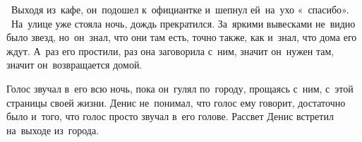 ~Выходя из~кафе, он~подошел к~официантке и~шепнул ей~на~ухо «~спасибо».
~На~улице уже стояла ночь, дождь прекратился.
За~яркими вывесками не~видно было звезд, но~он~знал, что они там есть, точно также, как и~знал, что дома его ждут.
А~раз его простили, раз она заговорила с~ним, значит он~нужен там, значит он~возвращается домой.
 
Голос звучал в~его всю ночь, пока он~гулял по~городу, прощаясь с~ним, с~этой страницы своей жизни.
Денис не~понимал, что голос ему говорит, достаточно было и~того, что голос просто звучал в~его голове.
Рассвет Денис встретил на~выходе из~города.

